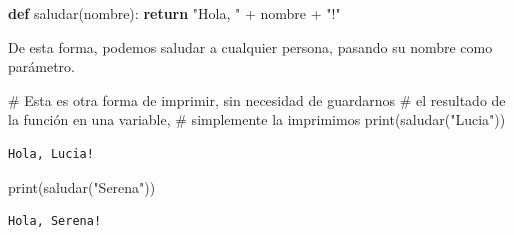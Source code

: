 \documentclass[
  letterpaper,
  DIV=11,
  numbers=noendperiod]{scrreprt}
\newenvironment{Shaded}{\begin{snugshade}}{\end{snugshade}}
\newcommand{\BuiltInTok}[1]{\textcolor[rgb]{0.00,0.23,0.31}{#1}}
\newcommand{\CommentTok}[1]{\textcolor[rgb]{0.37,0.37,0.37}{#1}}
\newcommand{\ControlFlowTok}[1]{\textcolor[rgb]{0.00,0.23,0.31}{\textbf{#1}}}
\newcommand{\KeywordTok}[1]{\textcolor[rgb]{0.00,0.23,0.31}{\textbf{#1}}}
\newcommand{\NormalTok}[1]{\textcolor[rgb]{0.00,0.23,0.31}{#1}}
\newcommand{\OperatorTok}[1]{\textcolor[rgb]{0.37,0.37,0.37}{#1}}
\newcommand{\StringTok}[1]{\textcolor[rgb]{0.13,0.47,0.30}{#1}}
\begin{document}
\begin{Shaded}
\begin{Highlighting}[]
\KeywordTok{def}\NormalTok{ saludar(nombre):}
  \ControlFlowTok{return} \StringTok{"Hola, "} \OperatorTok{+}\NormalTok{ nombre }\OperatorTok{+} \StringTok{"!"}
\end{Highlighting}
\end{Shaded}

De esta forma, podemos saludar a cualquier persona, pasando su nombre
como parámetro.

\begin{Shaded}
\begin{Highlighting}[]
\CommentTok{\# Esta es otra forma de imprimir, sin necesidad de guardarnos}
\CommentTok{\# el resultado de la función en una variable,}
\CommentTok{\# simplemente la imprimimos}
\BuiltInTok{print}\NormalTok{(saludar(}\StringTok{"Lucia"}\NormalTok{))}
\end{Highlighting}
\end{Shaded}

\begin{verbatim}
Hola, Lucia!
\end{verbatim}

\begin{Shaded}
\begin{Highlighting}[]
\BuiltInTok{print}\NormalTok{(saludar(}\StringTok{"Serena"}\NormalTok{))}
\end{Highlighting}
\end{Shaded}

\begin{verbatim}
Hola, Serena!
\end{verbatim}
\end{document}
